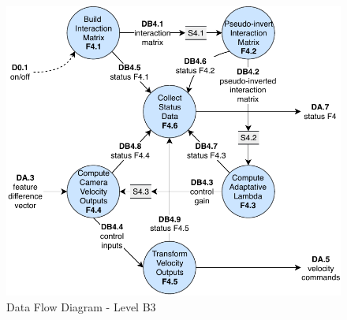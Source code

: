 \begin{figure}[!htb]
	\caption{Data Flow Diagram - Level B3}
	\label{fig:sa_diag_05}
	\centering
	\includegraphics[width=\textwidth]{content/chapter_03/images/sa_diagram_05.pdf}
\end{figure}

\pagebreak

